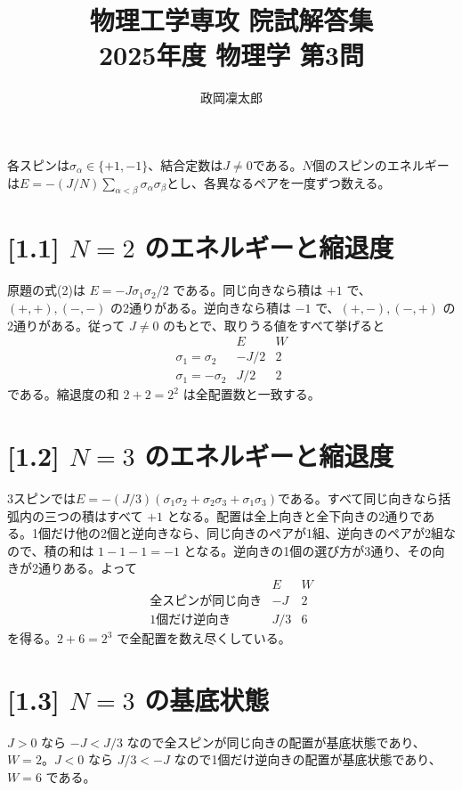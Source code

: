 \documentclass[11pt,a4paper]{article}
\title{物理工学専攻 院試解答集\\2025年度 物理学 第3問}
\author{政岡凜太郎}
\date{}
\begin{document}
\maketitle

各スピンは$\sigma_\alpha\in\{+1,-1\}$、結合定数は$J\ne0$である。$N$個のスピンのエネルギーは$E=-(J/N)\sum_{\alpha<\beta}\sigma_\alpha\sigma_\beta$とし、各異なるペアを一度ずつ数える。

\section*{[1.1] $N=2$ のエネルギーと縮退度}
原題の式(2)は $E=-J\sigma_1\sigma_2/2$ である。同じ向きなら積は $+1$ で、$(+,+),(-,-)$ の2通りがある。逆向きなら積は $-1$ で、$(+,-),(-,+)$ の2通りがある。従って $J\ne0$ のもとで、取りうる値をすべて挙げると
\[
\begin{array}{c|cc}
 & E & W\\ \hline
\sigma_1=\sigma_2 & -J/2 & 2\\
\sigma_1=-\sigma_2 & J/2 & 2
\end{array}
\]
である。縮退度の和 $2+2=2^2$ は全配置数と一致する。

\section*{[1.2] $N=3$ のエネルギーと縮退度}
3スピンでは$E=-(J/3)(\sigma_1\sigma_2+\sigma_2\sigma_3+\sigma_1\sigma_3)$である。すべて同じ向きなら括弧内の三つの積はすべて $+1$ となる。配置は全上向きと全下向きの2通りである。1個だけ他の2個と逆向きなら、同じ向きのペアが1組、逆向きのペアが2組なので、積の和は $1-1-1=-1$ となる。逆向きの1個の選び方が3通り、その向きが2通りある。よって
\[
\begin{array}{c|cc}
 & E & W\\ \hline
\text{全スピンが同じ向き} & -J & 2\\
\text{1個だけ逆向き} & J/3 & 6
\end{array}
\]
を得る。$2+6=2^3$ で全配置を数え尽くしている。

\section*{[1.3] $N=3$ の基底状態}
$J>0$ なら $-J<J/3$ なので全スピンが同じ向きの配置が基底状態であり、$\boxed{W=2}$。$J<0$ なら $J/3<-J$ なので1個だけ逆向きの配置が基底状態であり、$\boxed{W=6}$ である。
\end{document}
